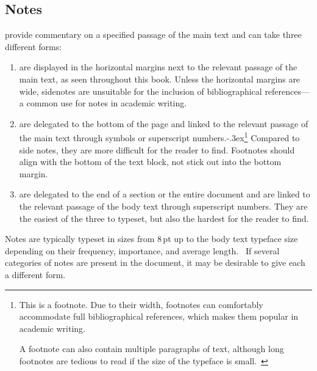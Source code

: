 \subsection{Notes}
 provide commentary on a specified passage of the main text and can
take three different forms:
\begin{enumerate}
  \item[1] are displayed in the horizontal margins next to the
    relevant passage of the main text, as seen throughout this book.  Unless the
    horizontal margins are wide, sidenotes are unsuitable for the inclusion
    of bibliographical references---a common use for notes in academic writing.
  \item[2] are delegated to the bottom of the page and linked
    to the relevant passage of the main text through symbols or superscript
    numbers.\kern-.3ex\footnote{%
      This is a footnote. Due to their width, footnotes can
      comfortably accommodate full bibliographical references, which makes them
      popular in academic writing.
      
      A footnote can also contain multiple paragraphs of text, although long
      footnotes are tedious to read if the size of the typeface is
      small.~\cite[sec.\,4.3.1]{bringhurst92}}
    Compared to side notes, they are more difficult for the reader to find.
    Footnotes should align with the bottom of the text block, not stick out into
    the bottom margin.~\cite[para.\,48]{kapr99}
  \item[3] are delegated to the end of a section or the entire
    document and are linked to the relevant passage of the body text through
    superscript numbers. They are the easiest of the three to typeset, but also
    the hardest for the reader to find.
\end{enumerate}

Notes are typically typeset in sizes from 8\,pt up to the body text typeface
size depending on their frequency, importance, and average
length.~\cite[sec.\,4.3]{bringhurst92} If several categories of notes are
present in the document, it may be desirable to give each a different form.

